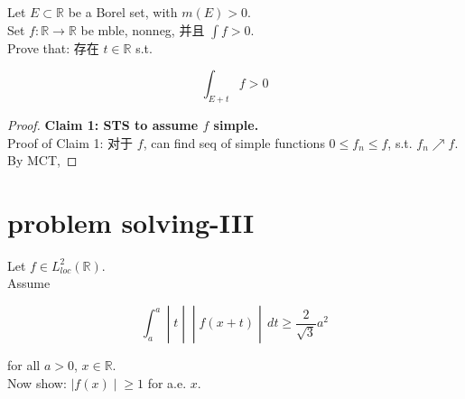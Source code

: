\documentclass{qlnotes-export}
\begin{document}
\begin{example}\label{ex-lec36-problem-solving-example-004}

Let \(E \subset {\mathbb{R}}\) be a Borel set, with \(m(E) > 0\).\\
Set \(f:{\mathbb{R}}\rightarrow{\mathbb{R}}\) be mble, nonneg, 并且 \(\int f > 0\).\\
Prove that: 存在 \(t \in {\mathbb{R}}\) s.t.

\[\int_{E + t}f > 0\]

\end{example}

\begin{proof}

\textbf{Claim 1: STS to assume \(f\) simple.}\\
Proof of Claim 1: 对于 \(f\), can find seq of simple functions \(0 \leq f_{n} \leq f\), s.t. \(f_{n}\operatorname{\nearrow ︎}f\).\\
By MCT,

\end{proof}

\chapter{problem solving-III}\label{problem-solving-iii}

\begin{example}\label{ex-lec37-problem-solving-iii-example-001}

Let \(f \in L_{loc}^{2}({\mathbb{R}})\).\\
Assume

\[\left. \int_{a}^{a} \middle| t \middle| \middle| f(x + t) \middle| \, dt \geq \frac{2}{\sqrt{3}}a^{2} \right.\]

for all \(a > 0\), \(x \in {\mathbb{R}}\).\\
Now show: \(\left. |f(x) \middle| \geq 1 \right.\) for a.e. \(x\).\\

\end{example}
\end{document}
